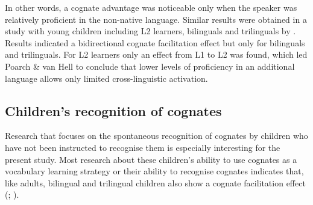 \documentclass[output=paper,modfonts,nonflat,newtxmath]{langsci/langscibook}
\begin{document}
{In other words, a cognate advantage was noticeable only when the speaker was relatively proficient in the non-native language. Similar results were obtained in a study with young children including L2 learners, bilinguals and trilinguals by \citet{PoarchvanHell2012}. Results indicated a bidirectional cognate facilitation effect but only for bilinguals and trilinguals. For L2 learners only an effect from L1 to L2 was found, which led Poarch \& van Hell to conclude that lower levels of proficiency in an additional language allows only limited cross-linguistic activation.}


\subsection{Children’s recognition of cognates}

{Research that focuses on the spontaneous recognition of cognates by children who have not been instructed to recognise them is especially interesting for the present study. Most research about these children’s ability to use cognates as a vocabulary learning strategy or their ability to recognise cognates indicates that, like adults, bilingual and trilingual children also show a cognate facilitation effect (\citealt{PoarchvanHell2012}; \citealt{PotapovaEtAl2016}).}
\end{document}
